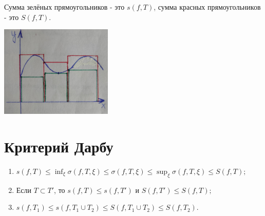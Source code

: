     Сумма зелёных прямоугольников - это $s(f, T)$, сумма красных прямоугольников - это $S(f, T)$.
    
    \begin{center}
    	\includegraphics[width=0.4\textwidth]{img/lecture25/integral_darbu}
    \end{center}
    
    \section{Критерий Дарбу}
    
    \begin{lemma}
    	\begin{enumerate}
    		\item $s(f, T) \leqslant \displaystyle\inf_{\xi} \sigma(f, T, \xi) \leqslant \sigma(f, T, \xi) \leqslant \sup_{\xi}{\sigma(f, T, \xi)} \leqslant S(f, T);$
    		\item Если $T \subset T'$, то $s(f, T) \leqslant s(f, T')$ и $S(f, T') \leqslant S(f, T);$
    		\item $s(f, T_1) \leqslant s(f, T_1 \cup T_2) \leqslant S(f, T_1 \cup T_2) \leqslant S(f, T_2).$ 
    	\end{enumerate}
    \end{lemma}
    
